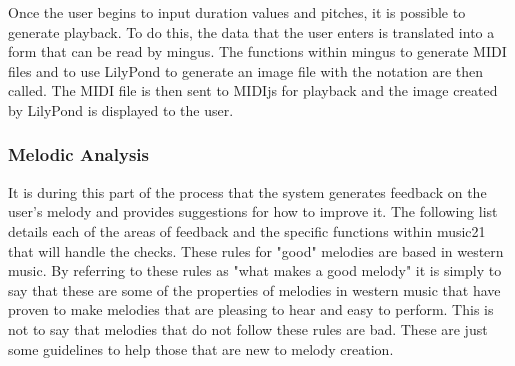\vspace{\baselineskip}

Once the user begins to input duration values and pitches, it is possible to generate playback.  To do this, the data that the user enters is translated into a form that can be read by mingus.  The functions within mingus to generate MIDI files and to use LilyPond to generate an image file with the notation are then called.  The MIDI file is then sent to MIDIjs for playback and the image created by LilyPond is displayed to the user.

\subsubsection{Melodic Analysis}
\label{subsubsec:melodicanalysis}

It is during this part of the process that the system generates feedback on the user's melody and provides suggestions for how to improve it.  The following list details each of the areas of feedback and the specific functions within music21 that will handle the checks.  These rules for "good" melodies are based in western music.  By referring to these rules as "what makes a good melody" it is simply to say that these are some of the properties of melodies in western music that have proven to make melodies that are pleasing to hear and easy to perform.  This is not to say that melodies that do not follow these rules are bad.  These are just some guidelines to help those that are new to melody creation.

